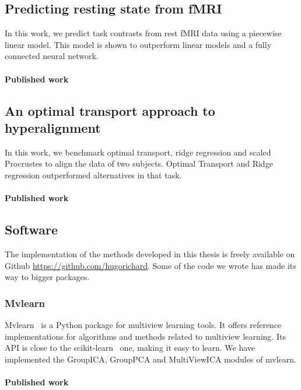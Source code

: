 \documentclass[ twoside,openright,titlepage,numbers=noenddot,%
                headinclude,footinclude,cleardoublepage=empty,abstract=on,
                BCOR=5mm,paper=a4,fontsize=11pt, 
                ]{scrreprt}
\begin{document}
\subsection{Predicting resting state from fMRI}
In this work, we predict task contrasts from rest fMRI data using a piecewise
  linear model. This model is shown to outperform linear models and a fully
  connected neural network.

  
\paragraph{Published work}

\subsection{An optimal transport approach to hyperalignment}
In this work, we benchmark optimal transport, ridge regression and scaled
Procrustes to align the data of two
subjects. Optimal Transport and Ridge regression outperformed alternatives in that task.

\paragraph{Published work}


\subsection{Software}
The implementation of the methods developed in this thesis is freely available on Github \url{https://github.com/hugorichard}. Some of the code we wrote has made its way to bigger packages. 

\subsubsection{Mvlearn}
Mvlearn~\cite{perry2020mvlearn} is a Python package for multiview learning tools. It offers reference
implementations for algorithms and methods related to multiview learning.
Its API is close to the scikit-learn~\cite{abraham2014machine} one, making it
easy to learn.
We have implemented the GroupICA, GroupPCA and MultiViewICA modules of mvlearn.

\paragraph{Published work}
\end{document}
